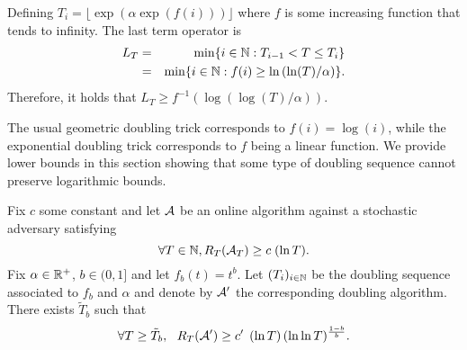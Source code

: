 \documentclass[12pt]{colt2018} %
\begin{document}

Defining $T_i = \lfloor \exp(\alpha \exp(f(i)))\rfloor$ where $f$ is some increasing function that tends to infinity. The last term operator is
\begin{eqnarray*}
    L_T & = & \min \{ i \in \mathbb{N} : T_{i-1} < T \leq T_i \} \\
    &= & \min \{ i \in \mathbb{N} : f(i) \geq \ln\left(\ln(T)/\alpha\right)\}.
\end{eqnarray*}
Therefore, it holds that $L_T \geq f^{-1}\left(\log\left(\log(T)/\alpha\right)\right)$.

The usual geometric doubling trick corresponds to $f(i) = \log(i)$, while the exponential doubling trick corresponds to $f$ being a linear function. We provide lower bounds in this section showing that some type of doubling sequence cannot preserve logarithmic bounds.

\begin{theorem}\label{thm:LowerBounds}
    Fix $c$ some constant and let $\mathcal{A}$ be an online algorithm against a stochastic adversary satisfying
    \[ \forall T \in \mathbb{N},  R_T(\mathcal{A}_T) \geq c \; (\ln T).\]
    Fix $\alpha \in \mathbb{R}^+$, $b \in (0,1]$ and let $f_b(t) = t^b$. Let $(T_i)_{i\in\mathbb{N}}$ be the doubling sequence associated to $f_b$ and $\alpha$ and denote by $\mathcal{A}'$ the corresponding doubling algorithm. There exists $\tilde{T}_b$ such that
    \begin{equation}\label{eq:LowerBoundGeom_log_1}
        \forall T \geq \tilde{T}_b, \ \
        R_T(\mathcal{A}') \geq
        c' \; \left(\ln T\right)(\ln \ln T)^{\frac{1-b}{b}}.
    \end{equation}
\end{theorem}


\end{document}
